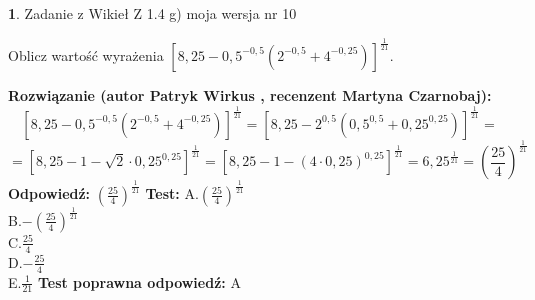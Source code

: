 \documentclass[12pt, a4paper]{article}
\theoremstyle{definition} %
\newtheorem{zad}{}
\newcommand{\zadStart}[1]{\begin{zad}#1\newline}
\newcommand{\zadStop}{\end{zad}}
\newcommand{\rozwStart}[2]{\noindent \textbf{Rozwiązanie (autor #1 , recenzent #2): }\newline}
\newcommand{\rozwStop}{\newline}
\newcommand{\odpStart}{\noindent \textbf{Odpowiedź:}\newline}
\newcommand{\odpStop}{\newline}
\newcommand{\testStart}{\noindent \textbf{Test:}\newline}
\newcommand{\testStop}{\newline}
\newcommand{\kluczStart}{\noindent \textbf{Test poprawna odpowiedź:}\newline}
\newcommand{\kluczStop}{\newline}
\begin{document}
\zadStart{Zadanie z Wikieł Z 1.4 g) moja wersja nr 10}

Oblicz wartość wyrażenia $[8,25-0,5^{-0,5}(2^{-0,5}+4^{-0,25})]^{\frac{1}{21}}$.
\zadStop
\rozwStart{Patryk Wirkus}{Martyna Czarnobaj}
$$[8,25-0,5^{-0,5}(2^{-0,5}+4^{-0,25})]^{\frac{1}{21}} = [8,25-2^{0,5}(0,5^{0,5}+0,25^{0,25})]^{\frac{1}{21}} =$$
$$=[8,25 - 1 - \sqrt{2} \cdot 0,25^{0,25}]^{\frac{1}{21}} = [8,25 - 1 - (4\cdot 0,25)^{0,25}]^{\frac{1}{21}} = 6,25^{\frac{1}{21}} = (\frac{25}{4})^{\frac{1}{21}}$$
\rozwStop
\odpStart
$(\frac{25}{4})^{\frac{1}{21}}$
\odpStop
\testStart
A.$(\frac{25}{4})^{\frac{1}{21}}$\\ B.$-(\frac{25}{4})^{\frac{1}{21}}$\\ C.$\frac{25}{4}$\\ D.$-\frac{25}{4}$\\ E.$\frac{1}{21}$
\testStop
\kluczStart
A
\kluczStop
\end{document}
